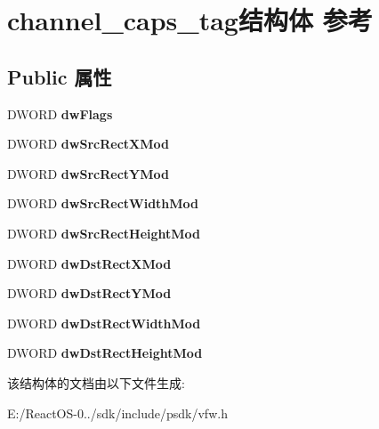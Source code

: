 \hypertarget{structchannel__caps__tag}{}\section{channel\+\_\+caps\+\_\+tag结构体 参考}
\label{structchannel__caps__tag}
\subsection*{Public 属性}
\begin{DoxyCompactItemize}
\item 
\mbox{\label{structchannel__caps__tag_af2811e49d00702052dc64643a65b1d2f}} 
D\+W\+O\+RD {\bfseries dw\+Flags}
\item 
\mbox{\label{structchannel__caps__tag_a536a26fe5015b4eae2561d2e430db48b}} 
D\+W\+O\+RD {\bfseries dw\+Src\+Rect\+X\+Mod}
\item 
\mbox{\label{structchannel__caps__tag_a71dc22d93e21e82d1217f57e09536f83}} 
D\+W\+O\+RD {\bfseries dw\+Src\+Rect\+Y\+Mod}
\item 
\mbox{\label{structchannel__caps__tag_a4a0e59f7bd193b5b976c57961e5507aa}} 
D\+W\+O\+RD {\bfseries dw\+Src\+Rect\+Width\+Mod}
\item 
\mbox{\label{structchannel__caps__tag_a9479d748a8a974d39be3d042aac143f5}} 
D\+W\+O\+RD {\bfseries dw\+Src\+Rect\+Height\+Mod}
\item 
\mbox{\label{structchannel__caps__tag_ae31da9f4c5635fcfdf5ae72b17b1fb95}} 
D\+W\+O\+RD {\bfseries dw\+Dst\+Rect\+X\+Mod}
\item 
\mbox{\label{structchannel__caps__tag_aacb54dfed21d4c9a287d925cf596f90c}} 
D\+W\+O\+RD {\bfseries dw\+Dst\+Rect\+Y\+Mod}
\item 
\mbox{\label{structchannel__caps__tag_abb6d35ee5f56c450a072b856b3385372}} 
D\+W\+O\+RD {\bfseries dw\+Dst\+Rect\+Width\+Mod}
\item 
\mbox{\label{structchannel__caps__tag_a7b06a9da8156e0f2d19f3c934b267632}} 
D\+W\+O\+RD {\bfseries dw\+Dst\+Rect\+Height\+Mod}
\end{DoxyCompactItemize}


该结构体的文档由以下文件生成\+:\begin{DoxyCompactItemize}
\item 
E\+:/\+React\+O\+S-\/0../sdk/include/psdk/vfw.\+h\end{DoxyCompactItemize}
